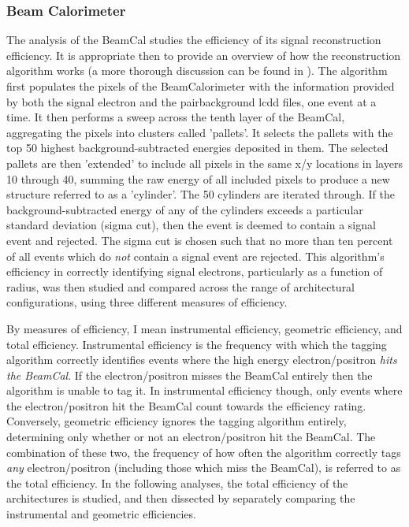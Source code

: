 \documentclass{report}
\begin{document}
                \subsubsection{Beam Calorimeter}
                    The analysis of the BeamCal studies the efficiency of its signal reconstruction efficiency. It is appropriate then to provide an overview of how the reconstruction algorithm works (a more thorough discussion can be found in \cite{bogert_thesis}). The algorithm first populates the pixels of the BeamCalorimeter with the information provided by both the signal electron and the pairbackground lcdd files, one event at a time. It then performs a sweep across the tenth layer of the BeamCal, aggregating the pixels into clusters called 'pallets'. It selects the pallets with the top 50 highest background-subtracted energies deposited in them. The selected pallets are then 'extended' to include all pixels in the same x/y locations in layers 10 through 40, summing the raw energy of all included pixels to produce a new structure referred to as a 'cylinder'. The 50 cylinders are iterated through. If the background-subtracted energy of any of the cylinders exceeds a particular standard deviation (sigma cut), then the event is deemed to contain a signal event and rejected. The sigma cut is chosen such that no more than ten percent of all events which do \textit{not} contain a signal event are rejected. This algorithm's efficiency in correctly identifying signal electrons, particularly as a function of radius, was then studied and compared across the range of architectural configurations, using three different measures of efficiency.

                    By measures of efficiency, I mean instrumental efficiency, geometric efficiency, and total efficiency. Instrumental efficiency is the frequency with which the tagging algorithm correctly identifies events where the high energy electron/positron \textit{hits the BeamCal}. If the electron/positron misses the BeamCal entirely then the algorithm is unable to tag it. In instrumental efficiency though, only events where the electron/positron hit the BeamCal count towards the efficiency rating. Conversely, geometric efficiency ignores the tagging algorithm entirely, determining only whether or not an electron/positron hit the BeamCal. The combination of these two, the frequency of how often the algorithm correctly tags \textit{any} electron/positron (including those which miss the BeamCal), is referred to as the total efficiency. In the following analyses, the total efficiency of the architectures is studied, and then dissected by separately comparing the instrumental and geometric efficiencies.
\end{document}
